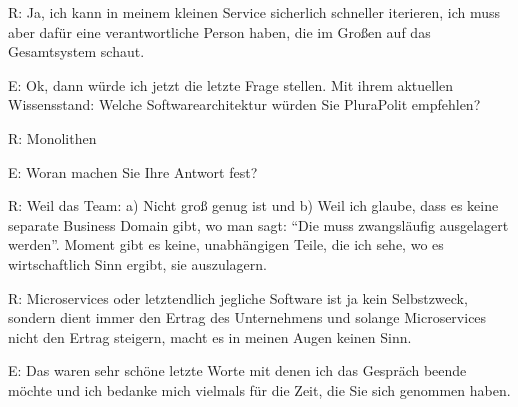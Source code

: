 \label{appendix:r-37}
R: Ja, ich kann in meinem kleinen Service sicherlich schneller iterieren, ich muss aber dafür eine verantwortliche Person haben, die im Großen auf das Gesamtsystem schaut.

E: Ok, dann würde ich jetzt die letzte Frage stellen. 
Mit ihrem aktuellen Wissensstand: Welche Softwarearchitektur würden Sie PluraPolit empfehlen?

\label{appendix:r-38}
R: Monolithen

E: Woran machen Sie Ihre Antwort fest?

\label{appendix:r-39} \label{appendix:r-40}
R: Weil das Team: a) Nicht groß genug ist und b) Weil ich glaube, dass es keine separate Business Domain gibt, wo man sagt: “Die muss zwangsläufig ausgelagert werden”.
Moment gibt es keine, unabhängigen Teile, die ich sehe, wo es wirtschaftlich Sinn ergibt, sie auszulagern.

\label{appendix:r-41}
R: Microservices oder letztendlich jegliche Software ist ja kein Selbstzweck, sondern dient immer den Ertrag des Unternehmens und solange Microservices nicht den Ertrag steigern, macht es in meinen Augen keinen Sinn.

E: Das waren sehr schöne letzte Worte mit denen ich das Gespräch beende möchte und ich bedanke mich vielmals für die Zeit, die Sie sich genommen haben.
